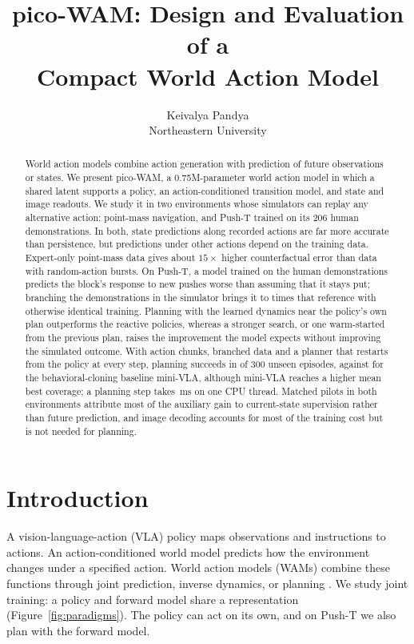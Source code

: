 \documentclass[11pt]{article}
\title{pico-WAM: Design and Evaluation of a\\Compact World Action Model}
\author{Keivalya Pandya\\Northeastern University}
\date{}
\begin{document}
\maketitle

\begin{abstract}
World action models combine action generation with prediction of future observations or states. We present pico-WAM, a 0.75M-parameter world action model in which a shared latent supports a policy, an action-conditioned transition model, and state and image readouts. We study it in two environments whose simulators can replay any alternative action: point-mass navigation, and Push-T trained on its 206 human demonstrations. In both, state predictions along recorded actions are far more accurate than persistence, but predictions under other actions depend on the training data. Expert-only point-mass data gives about $15\times$ higher counterfactual error than data with random-action bursts. On Push-T, a model trained on the human demonstrations predicts the block's response to new pushes worse than assuming that it stays put; branching the demonstrations in the simulator brings it to \PTchunkBranchCfBlockRatio{} times that reference with otherwise identical training. Planning with the learned dynamics near the policy's own plan outperforms the reactive policies, whereas a stronger search, or one warm-started from the previous plan, raises the improvement the model expects without improving the simulated outcome. With action chunks, branched data and a planner that restarts from the policy at every step, planning succeeds in \PTfinalPlanSucc{} of 300 unseen episodes, against \PTfinalVlaSucc{} for the behavioral-cloning baseline mini-VLA, although mini-VLA reaches a higher mean best coverage; a planning step takes \PTlaptopPlanMs\,ms on one CPU thread. Matched pilots in both environments attribute most of the auxiliary gain to current-state supervision rather than future prediction, and image decoding accounts for most of the training cost but is not needed for planning.

\end{abstract}

\section{Introduction}

A vision-language-action (VLA) policy maps observations and instructions to actions. An action-conditioned world model predicts how the environment changes under a specified action. World action models (WAMs) combine these functions through joint prediction, inverse dynamics, or planning \citep{lu2026survey,shen2026survey}. We study joint training: a policy and forward model share a representation (Figure~\ref{fig:paradigms}). The policy can act on its own, and on Push-T we also plan with the forward model.
\end{document}
